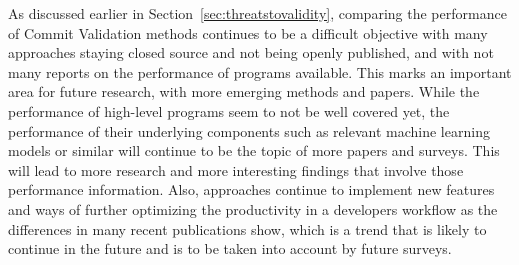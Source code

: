 As discussed earlier in Section~\ref{sec:threatstovalidity}, %
comparing the performance of Commit Validation methods continues to be a difficult objective with many approaches staying closed source and not being openly published, and with not many reports on the performance of programs available. This marks an important area for future research, with more emerging methods and papers. 
While the performance of high-level programs seem to not be well covered yet, the performance of their underlying components such as relevant machine learning models or similar will continue to be the topic of more papers and surveys. This will lead to more research and more interesting findings that involve those performance information.
Also, approaches continue to implement new features and ways of further optimizing the productivity in a developers workflow as the differences in many recent publications show, which is a trend that is likely to continue in the future and is to be taken into account by future surveys.
